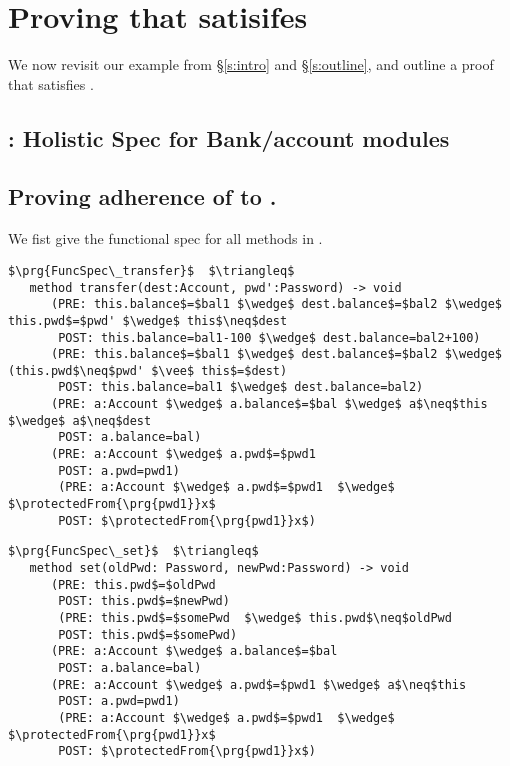 \section{Proving that \ModC satisifes \SrobustB}
\label{s:examples}
We now revisit our example from  \S  \ref{s:intro} and \S \ref{s:outline},
and outline a proof that \ModC satisfies \SrobustB. 

\subsection{\SrobustB: Holistic Spec for Bank/account modules}


\subsection{Proving adherence of \ModC to \SrobustB.} 


We fist give the functional spec for all methods in \ModC.
 
\begin{lstlisting}[mathescape=true,xleftmargin=2em,frame=lines,framexleftmargin=1.5em, language=Chainmail]
$\prg{FuncSpec\_transfer}$  $\triangleq$
   method transfer(dest:Account, pwd':Password) -> void  
      (PRE: this.balance$=$bal1 $\wedge$ dest.balance$=$bal2 $\wedge$ this.pwd$=$pwd' $\wedge$ this$\neq$dest
       POST: this.balance=bal1-100 $\wedge$ dest.balance=bal2+100)
      (PRE: this.balance$=$bal1 $\wedge$ dest.balance$=$bal2 $\wedge$ (this.pwd$\neq$pwd' $\vee$ this$=$dest)
       POST: this.balance=bal1 $\wedge$ dest.balance=bal2)
      (PRE: a:Account $\wedge$ a.balance$=$bal $\wedge$ a$\neq$this $\wedge$ a$\neq$dest 
       POST: a.balance=bal)          
      (PRE: a:Account $\wedge$ a.pwd$=$pwd1  
       POST: a.pwd=pwd1)
       (PRE: a:Account $\wedge$ a.pwd$=$pwd1  $\wedge$ $\protectedFrom{\prg{pwd1}}x$
       POST: $\protectedFrom{\prg{pwd1}}x$)         
\end{lstlisting}

\begin{lstlisting}[mathescape=true,xleftmargin=2em,frame=lines,framexleftmargin=1.5em, language=Chainmail]
$\prg{FuncSpec\_set}$  $\triangleq$
   method set(oldPwd: Password, newPwd:Password) -> void  
      (PRE: this.pwd$=$oldPwd  
       POST: this.pwd$=$newPwd)
       (PRE: this.pwd$=$somePwd  $\wedge$ this.pwd$\neq$oldPwd 
       POST: this.pwd$=$somePwd)
      (PRE: a:Account $\wedge$ a.balance$=$bal  
       POST: a.balance=bal)          
      (PRE: a:Account $\wedge$ a.pwd$=$pwd1 $\wedge$ a$\neq$this
       POST: a.pwd=pwd1)
       (PRE: a:Account $\wedge$ a.pwd$=$pwd1  $\wedge$ $\protectedFrom{\prg{pwd1}}x$
       POST: $\protectedFrom{\prg{pwd1}}x$)         
\end{lstlisting}

